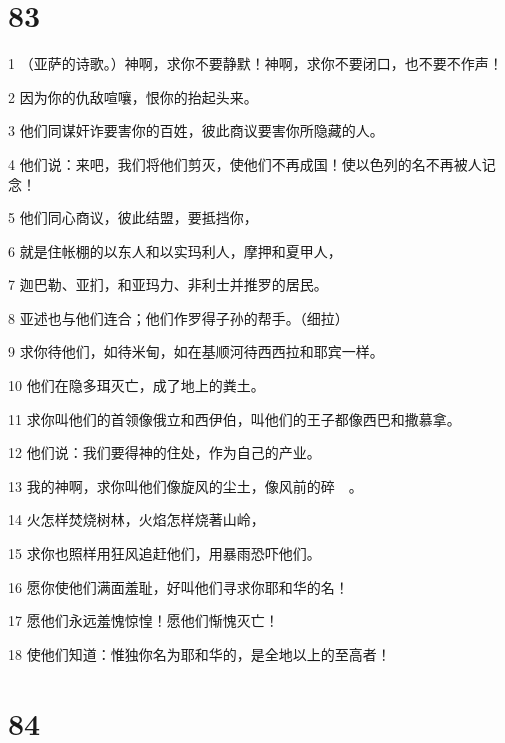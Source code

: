 \chapter{83}

\par 1 （亚萨的诗歌。）神啊，求你不要静默！神啊，求你不要闭口，也不要不作声！
\par 2 因为你的仇敌喧嚷，恨你的抬起头来。
\par 3 他们同谋奸诈要害你的百姓，彼此商议要害你所隐藏的人。
\par 4 他们说：来吧，我们将他们剪灭，使他们不再成国！使以色列的名不再被人记念！
\par 5 他们同心商议，彼此结盟，要抵挡你，
\par 6 就是住帐棚的以东人和以实玛利人，摩押和夏甲人，
\par 7 迦巴勒、亚扪，和亚玛力、非利士并推罗的居民。
\par 8 亚述也与他们连合；他们作罗得子孙的帮手。（细拉）
\par 9 求你待他们，如待米甸，如在基顺河待西西拉和耶宾一样。
\par 10 他们在隐多珥灭亡，成了地上的粪土。
\par 11 求你叫他们的首领像俄立和西伊伯，叫他们的王子都像西巴和撒慕拿。
\par 12 他们说：我们要得神的住处，作为自己的产业。
\par 13 我的神啊，求你叫他们像旋风的尘土，像风前的碎　。
\par 14 火怎样焚烧树林，火焰怎样烧著山岭，
\par 15 求你也照样用狂风追赶他们，用暴雨恐吓他们。
\par 16 愿你使他们满面羞耻，好叫他们寻求你耶和华的名！
\par 17 愿他们永远羞愧惊惶！愿他们惭愧灭亡！
\par 18 使他们知道：惟独你名为耶和华的，是全地以上的至高者！

\chapter{84}

